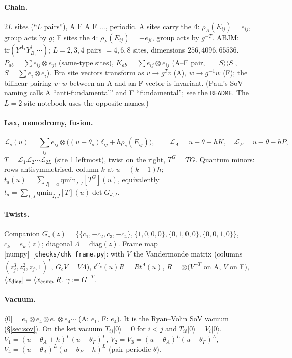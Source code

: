 \documentclass[11pt]{article}
\newcommand{\cL}{\mathcal L}
\newcommand{\nb}[1]{\texttt{#1}}
\newcommand{\npy}{\textsf{[numpy]}}
\newcommand{\ket}[1]{|#1\rangle}
\newcommand{\bra}[1]{\langle#1|}
\begin{document}
\paragraph{Chain.} $2L$ sites (``$L$ pairs''), A F A F $\dots$, periodic. A sites carry the $\mathbf4$:
$\rho_A(E_{ij})=e_{ij}$, group acts by $g$; F sites the $\bar{\mathbf4}$: $\rho_F(E_{ij})=-e_{ji}$, group acts by $g^{-T}$.
ABJM: $\mathrm{tr}(Y^{A_1}Y^\dagger_{B_1}\cdots)$; $L=2,3,4$ pairs $=4,6,8$ sites, dimensions $256,4096,65536$.
$P_{ab}=\sum e_{ij}\otimes e_{ji}$ (same-type sites), $K_{ab}=\sum e_{ij}\otimes e_{ij}$ (A--F pair, $=|S\rangle\langle S|$,
$S=\sum e_i\otimes e_i$). Bra site vectors transform as $v\to g^Tv$ (A), $w\to g^{-1}w$ (F); the bilinear pairing $v\cdot w$
between an A and an F vector is invariant. (Paul's SoV naming calls A ``anti-fundamental'' and F ``fundamental''; see the
\nb{README}. The $L=2$-site notebook uses the opposite names.)

\paragraph{Lax, monodromy, fusion.}
\begin{equation}
 \cL_s(u)=\sum_{ij}e_{ij}\otimes\big((u-\theta_s)\delta_{ij}+h\rho_s(E_{ij})\big),\qquad
 \cL_A=u-\theta+hK,\quad \cL_F=u-\theta-hP,
\end{equation}
$T=\cL_1\cL_2\cdots\cL_{2L}$ (site 1 leftmost), twist on the right, $T^G=TG$. Quantum minors: rows antisymmetrised,
column $k$ at $u-(k-1)h$; $t_a(u)=\sum_{|I|=a}\mathrm{qmin}_{I,I}[T^G](u)$, equivalently
$t_a=\sum_{I,J}\mathrm{qmin}_{I,J}[T](u)\det G_{J,I}$.

\paragraph{Twists.} Companion $G_c(z)=\{\{c_1,-c_2,c_3,-c_4\},\{1,0,0,0\},\{0,1,0,0\},\{0,0,1,0\}\}$, $c_k=e_k(z)$;
diagonal $\Lambda=\mathrm{diag}(z)$. Frame map \npy\ [\nb{checks/chk\_frame.py}]: with $V$ the Vandermonde matrix
(columns $(z_j^3,z_j^2,z_j,1)^T$, $G_cV=V\Lambda$), $t^{G_c}(u)R=Rt^{\Lambda}(u)$, $R=\otimes(V^{-T}$ on A, $V$ on F$)$,
$\bra{x_{\rm diag}}=\bra{x_{\rm comp}}R$. $\gamma:=G^{-T}$.

\paragraph{Vacuum.} $\bra0=e_1\otimes e_4\otimes e_1\otimes e_4\cdots$ (A: $e_1$, F: $e_4$). It is the Ryan--Volin SoV vacuum
(\S\ref{sec:sov}). On the ket vacuum $T_{ij}\ket0=0$ for $i<j$ and
$T_{ii}\ket0=V_i\ket0$, $V_1=(u-\theta_A+h)^L(u-\theta_F)^L$, $V_2=V_3=(u-\theta_A)^L(u-\theta_F)^L$,
$V_4=(u-\theta_A)^L(u-\theta_F-h)^L$ (pair-periodic $\theta$).
\end{document}
